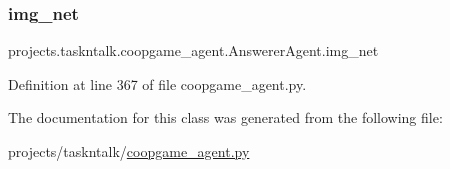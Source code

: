 \subsubsection{\texorpdfstring{img\+\_\+net}{img\_net}}
{\footnotesize\ttfamily projects.\+taskntalk.\+coopgame\+\_\+agent.\+Answerer\+Agent.\+img\+\_\+net}



Definition at line 367 of file coopgame\+\_\+agent.\+py.



The documentation for this class was generated from the following file\+:\begin{DoxyCompactItemize}
\item 
projects/taskntalk/\hyperlink{coopgame__agent_8py}{coopgame\+\_\+agent.\+py}\end{DoxyCompactItemize}
